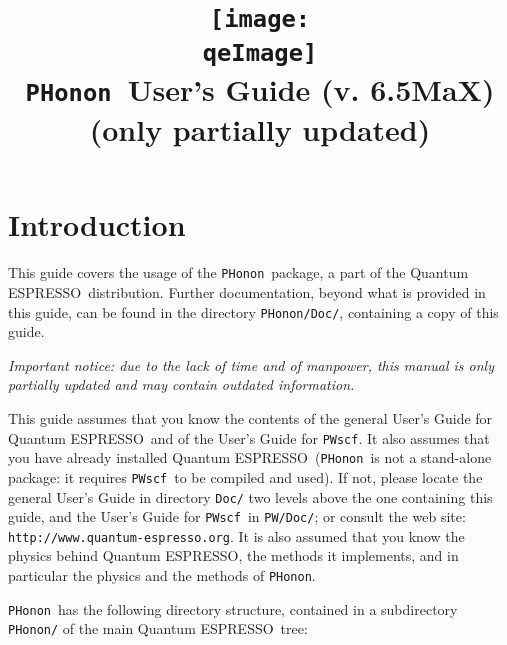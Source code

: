 \documentclass[12pt,a4paper]{article}
\def\version{6.5MaX}
\def\qe{{\sc Quantum ESPRESSO}}
\def\PWscf{\texttt{PWscf}}
\def\PHonon{\texttt{PHonon}}
\begin{document}
 
\author{}
\date{}

\def\qeImage{../../Doc/quantum_espresso.pdf}

\title{
  \texttt{[image: \\qeImage]} \\
  \Huge \PHonon\ User's Guide (v. \version)
  \\ \Large (only partially updated)
}

\maketitle

\tableofcontents

\section{Introduction}

This guide covers the usage of the \PHonon\ package, a
part of the \qe\ distribution. 
Further documentation, beyond what is provided 
in this guide, can be found in the directory
\texttt{PHonon/Doc/}, containing a copy of this guide.

{\em Important notice: due to the lack of time and of manpower, this
manual is only partially updated and may contain outdated information.}

This guide assumes that you know the contents of 
the general User's Guide for \qe\ and of the User's 
Guide for \PWscf. It also assumes that you have
already installed \qe\ (\PHonon\ is not a stand-alone
package: it requires \PWscf\ to be compiled and used).
If not, please locate the general User's Guide in directory 
\texttt{Doc/} two levels above the one containing this guide,
and the User's Guide for \PWscf\ in \texttt{PW/Doc/};
or consult the web site:\\
\texttt{http://www.quantum-espresso.org}.
It is also assumed that you know the physics behind \qe,
the methods it implements, and in particular the physics
and the methods of \PHonon.


\PHonon\ has the following directory structure,
contained in a subdirectory \texttt{PHonon/}
of the main \qe\ tree:
\end{document}
